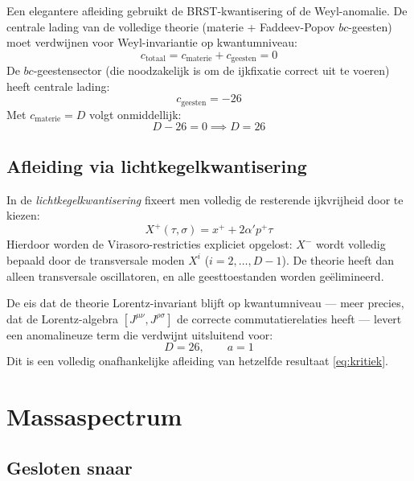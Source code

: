 \documentclass[12pt,a4paper]{article}
\begin{document}
Een elegantere afleiding gebruikt de BRST-kwantisering of de Weyl-anomalie. De centrale lading van de volledige theorie (materie + Faddeev-Popov $bc$-geesten) moet verdwijnen voor Weyl-invariantie op kwantumniveau:
\begin{equation}
  c_{\mathrm{totaal}} = c_{\mathrm{materie}} + c_{\mathrm{geesten}} = 0
\end{equation}
De $bc$-geestensector (die noodzakelijk is om de ijkfixatie correct uit te voeren) heeft centrale lading:
\begin{equation}
  c_{\mathrm{geesten}} = -26
\end{equation}
Met $c_{\mathrm{materie}} = D$ volgt onmiddellijk:
\begin{equation}
  D - 26 = 0 \implies \boxed{D = 26}
\end{equation}

\subsection{Afleiding via lichtkegelkwantisering}

In de \emph{lichtkegelkwantisering} fixeert men volledig de resterende ijkvrijheid door te kiezen:
\begin{equation}
  X^+(\tau,\sigma) = x^+ + 2\alpha' p^+\tau
\end{equation}
Hierdoor worden de Virasoro-restricties expliciet opgelost: $X^-$ wordt volledig bepaald door de transversale moden $X^i$ ($i = 2,\dots,D-1$). De theorie heeft dan alleen transversale oscillatoren, en alle geesttoestanden worden ge\"elimineerd.

De eis dat de theorie Lorentz-invariant blijft op kwantumniveau --- meer precies, dat de Lorentz-algebra $[J^{\mu\nu},J^{\rho\sigma}]$ de correcte commutatierelaties heeft --- levert een anomalineuze term die verdwijnt uitsluitend voor:
\begin{equation}
  D = 26, \qquad a = 1
\end{equation}
Dit is een volledig onafhankelijke afleiding van hetzelfde resultaat \eqref{eq:kritiek}.

\section{Massaspectrum}

\subsection{Gesloten snaar}
\end{document}
